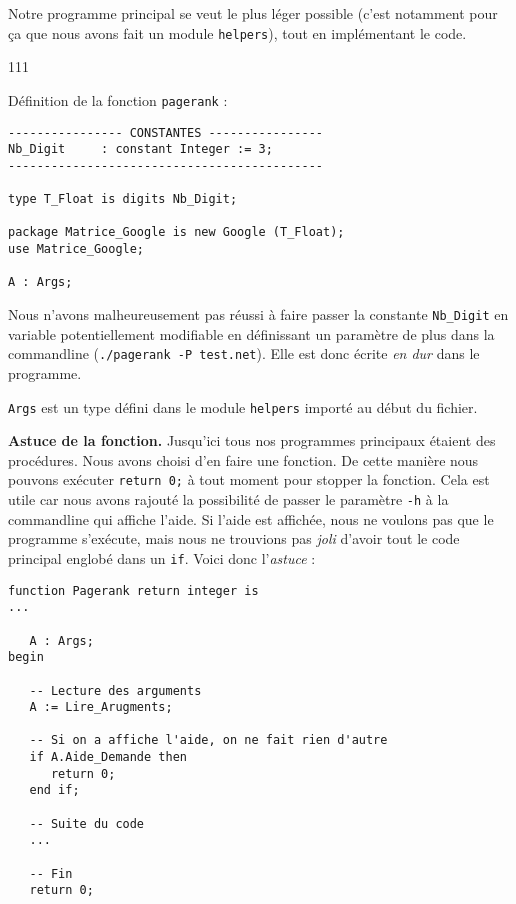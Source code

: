 Notre programme principal se veut le plus léger possible (c'est notamment pour ça que nous avons fait un module \lstinline{helpers}), tout en implémentant le code.

\begin{dinglist}{111}
   \item Définition de la fonction \lstinline{pagerank} :
      \begin{lstlisting}[caption=Définition de \lstinline{pagerank}]
---------------- CONSTANTES ----------------
Nb_Digit     : constant Integer := 3;
--------------------------------------------

type T_Float is digits Nb_Digit;

package Matrice_Google is new Google (T_Float);
use Matrice_Google;

A : Args;
      \end{lstlisting}
      
      Nous n'avons malheureusement pas réussi à faire passer la constante \lstinline{Nb_Digit} en variable potentiellement modifiable en définissant un paramètre de plus dans la commandline (\lstinline{./pagerank -P test.net}).
      Elle est donc écrite \textit{en dur} dans le programme.
      
      \lstinline{Args} est un type défini dans le module \lstinline{helpers} importé au début du fichier.
   \item \textbf{Astuce de la fonction.} Jusqu'ici tous nos programmes principaux étaient des procédures. Nous avons choisi d'en faire une fonction. De cette manière nous pouvons exécuter \lstinline{return 0;} à tout moment pour stopper la fonction.
   Cela est utile car nous avons rajouté la possibilité de passer le paramètre \lstinline{-h} à la commandline qui affiche l'aide. Si l'aide est affichée, nous ne voulons pas que le programme s'exécute, mais nous ne trouvions pas \textit{joli} 
   d'avoir tout le code principal englobé dans un \lstinline{if}. Voici donc l'\textit{astuce} :
   \begin{lstlisting}[caption=Astuce de la fonction principale]
function Pagerank return integer is
...

   A : Args;
begin

   -- Lecture des arguments
   A := Lire_Arugments;

   -- Si on a affiche l'aide, on ne fait rien d'autre
   if A.Aide_Demande then
      return 0;
   end if;

   -- Suite du code
   ...

   -- Fin
   return 0;


\end{lstlisting}
\end{dinglist}
